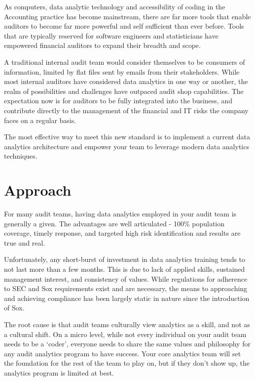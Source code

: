 \documentclass[
]{book}
\begin{document}
As computers, data analytic technology and accessibility of coding in the Accounting practice has become mainstream, there are far more tools that enable auditors to become far more powerful and self sufficient than ever before. Tools that are typically reserved for software engineers and statisticians have empowered financial auditors to expand their breadth and scope.

A traditional internal audit team would consider themselves to be consumers of information, limited by flat files sent by emails from their stakeholders. While most internal auditors have considered data analytics in one way or another, the realm of possibilities and challenges have outpaced audit shop capabilities. The expectation now is for auditors to be fully integrated into the business, and contribute directly to the management of the financial and IT risks the company faces on a regular basis.

The most effective way to meet this new standard is to implement a current data analytics architecture and empower your team to leverage modern data analytics techniques.

\hypertarget{approach}{%
\chapter{Approach}\label{approach}}

For many audit teams, having data analytics employed in your audit team is generally a given. The advantages are well articulated - 100\% population coverage, timely response, and targeted high risk identification and results are true and real.

Unfortunately, any short-burst of investment in data analytics training tends to not last more than a few months. This is due to lack of applied skills, sustained management interest, and consistency of values. While regulations for adherence to SEC and Sox requirements exist and are necessary, the means to approaching and achieving compliance has been largely static in nature since the introduction of Sox.

The root cause is that audit teams culturally view analytics as a skill, and not as a cultural shift. On a micro level, while not every individual on your audit team needs to be a `coder', everyone needs to share the same values and philosophy for any audit analytics program to have success. Your core analytics team will set the foundation for the rest of the team to play on, but if they don't show up, the analytics program is limited at best.
\end{document}
